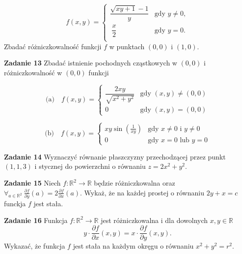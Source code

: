 \documentclass[a4paper,11pt]{article}
\newcommand{\RR}{\mathbb{R}}
\begin{document}
    $$ f(x,y) = 
    \begin{cases} 
        \dfrac{\sqrt{xy+1} - 1}{y} & \text{gdy } y \neq 0, \\ \; 
        \dfrac{x}{2} & \text{gdy } y = 0. \\ 
    \end{cases} 
    $$
Zbadać różniczkowalność funkcji $f$ w punktach $(0,0)$ i $(1,0)$.
    
\textbf{Zadanie 13} Zbadać istnienie pochodnych cząstkowych w $(0,0)$ i
różniczkowalność w $(0,0)$ funkcji 

$$
\text{(a)}
\quad
f(x,y)
=
\begin{cases}
    \dfrac{2x y}{\sqrt{x^2 + y^2}} & \text{gdy } (x,y) \neq (0,0) \\ 
    0 & \text{gdy } (x,y) = (0,0) \end{cases} 
$$

$$\text{(b)} \quad 
f(x,y) = 
\begin{cases} 
    x y \sin(\frac{1}{x y})& \text{gdy } x \neq 0 \text{ i } y\neq 0 \\ 
    0 & \text{gdy } x=0 \text{ lub } y=0 
\end{cases} 
$$

\bigskip

\textbf{Zadanie 14} Wyznaczyć równanie płaszczyzny przechodzącej przez
punkt $(1,1,3)$ i stycznej do powierzchni o równaniu $z = 2x^2 + y^2$.

\bigskip

\textbf{Zadanie 15} Niech $f: \RR^2 \to  \RR$ będzie różniczkowalna oraz
$\forall_{a\in \RR^2}~  \frac{\partial f}{\partial y}(a) = 2
\frac{\partial f}{\partial x}(a)$. Wykaż, że na każdej prostej o równaniu
$2y+x= c$ funckja  $f$ jest stała.

\bigskip

\textbf{Zadanie 16} Funkcja $f: \RR^2 \to \RR$ jest różniczkowalna i dla
dowolnych $x,y \in \RR$ 
$$ y \cdot \frac{\partial f}{\partial x}(x,y) = x
\cdot \frac{\partial f}{\partial y}(x,y). $$ 
Wykazać, że funkcja $f$ jest stała na każdym okręgu o równaniu $x^2 +y^2
= r^2$.
\end{document}
